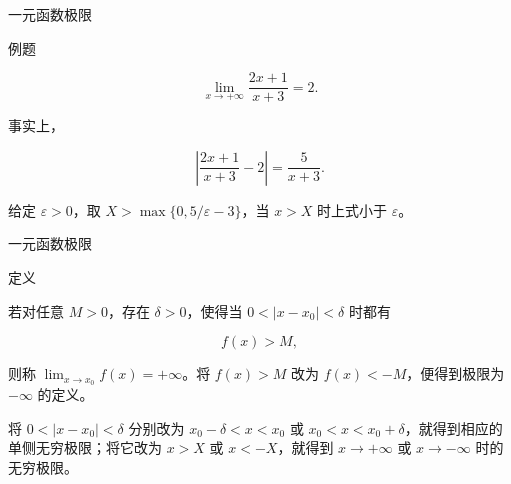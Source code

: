 \documentclass[aspectratio=169,10pt,fontset=fandol]{ctexbeamer}
\newenvironment{warning}{\par\noindent\textbf{注：}\quad}{\par\vspace{0.8em}}
\begin{document}
\begin{frame}[t,fragile]{一元函数极限}
\normalsize
\begin{block}{例题}
{\normalsize
\[

\lim_{x\to+\infty}\frac{2x+1}{x+3}=2.

\]

事实上，

\[

\left|\frac{2x+1}{x+3}-2\right|=\frac5{x+3}.

\]

给定 \(\varepsilon>0\)，取 \(X>\max\{0,5/\varepsilon-3\}\)，当 \(x>X\) 时上式小于 \(\varepsilon\)。


}
\end{block}
\end{frame}
\begin{frame}[t,fragile]{一元函数极限}
\normalsize
\begin{block}{定义}
{\normalsize


若对任意 \(M>0\)，存在 \(\delta>0\)，使得当 \(0<|x-x_0|<\delta\) 时都有

\[

f(x)>M,

\]

则称 \(\lim_{x\to x_0}f(x)=+\infty\)。将 \(f(x)>M\) 改为 \(f(x)<-M\)，便得到极限为 \(-\infty\) 的定义。



将 \(0<|x-x_0|<\delta\) 分别改为 \(x_0-\delta<x<x_0\) 或 \(x_0<x<x_0+\delta\)，就得到相应的单侧无穷极限；将它改为 \(x>X\) 或 \(x<-X\)，就得到 \(x\to+\infty\) 或 \(x\to-\infty\) 时的无穷极限。


}
\end{block}
\end{frame}
\end{document}
